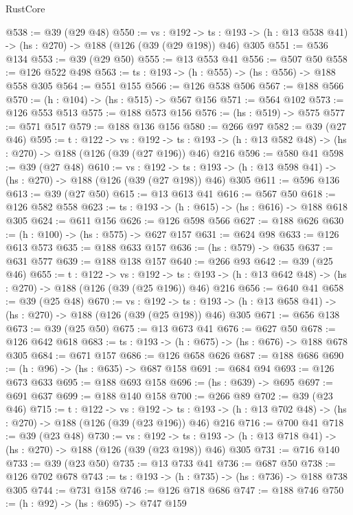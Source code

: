 \begin{lexlean}{RustCore}
\begin{coremodule}
@538 := @39 (@29 @48)
@550 := {vs : @192} ->
  {ts : @193} -> (h : @13 @538 @41) -> (hs : @270) -> @188 (@126 (@39 (@29 @198)) @46) @305
@551 := @536 @134
@553 := @39 (@29 @50)
@555 := @13 @553 @41
@556 := @507 @50
@558 := @126 @522 @498
@563 := {ts : @193} -> (h : @555) -> (hs : @556) -> @188 @558 @305
@564 := @551 @155
@566 := @126 @538 @506
@567 := @188 @566
@570 := (h : @104) -> (hs : @515) -> @567 @156
@571 := @564 @102
@573 := @126 @553 @513
@575 := @188 @573 @156
@576 := (hs : @519) -> @575
@577 := @571 @517
@579 := @188 @136 @156
@580 := @266 @97
@582 := @39 (@27 @46)
@595 := {t : @122} ->
  {vs : @192} ->
  {ts : @193} -> (h : @13 @582 @48) -> (hs : @270) -> @188 (@126 (@39 (@27 @196)) @46) @216
@596 := @580 @41
@598 := @39 (@27 @48)
@610 := {vs : @192} ->
  {ts : @193} -> (h : @13 @598 @41) -> (hs : @270) -> @188 (@126 (@39 (@27 @198)) @46) @305
@611 := @596 @136
@613 := @39 (@27 @50)
@615 := @13 @613 @41
@616 := @567 @50
@618 := @126 @582 @558
@623 := {ts : @193} -> (h : @615) -> (hs : @616) -> @188 @618 @305
@624 := @611 @156
@626 := @126 @598 @566
@627 := @188 @626
@630 := (h : @100) -> (hs : @575) -> @627 @157
@631 := @624 @98
@633 := @126 @613 @573
@635 := @188 @633 @157
@636 := (hs : @579) -> @635
@637 := @631 @577
@639 := @188 @138 @157
@640 := @266 @93
@642 := @39 (@25 @46)
@655 := {t : @122} ->
  {vs : @192} ->
  {ts : @193} -> (h : @13 @642 @48) -> (hs : @270) -> @188 (@126 (@39 (@25 @196)) @46) @216
@656 := @640 @41
@658 := @39 (@25 @48)
@670 := {vs : @192} ->
  {ts : @193} -> (h : @13 @658 @41) -> (hs : @270) -> @188 (@126 (@39 (@25 @198)) @46) @305
@671 := @656 @138
@673 := @39 (@25 @50)
@675 := @13 @673 @41
@676 := @627 @50
@678 := @126 @642 @618
@683 := {ts : @193} -> (h : @675) -> (hs : @676) -> @188 @678 @305
@684 := @671 @157
@686 := @126 @658 @626
@687 := @188 @686
@690 := (h : @96) -> (hs : @635) -> @687 @158
@691 := @684 @94
@693 := @126 @673 @633
@695 := @188 @693 @158
@696 := (hs : @639) -> @695
@697 := @691 @637
@699 := @188 @140 @158
@700 := @266 @89
@702 := @39 (@23 @46)
@715 := {t : @122} ->
  {vs : @192} ->
  {ts : @193} -> (h : @13 @702 @48) -> (hs : @270) -> @188 (@126 (@39 (@23 @196)) @46) @216
@716 := @700 @41
@718 := @39 (@23 @48)
@730 := {vs : @192} ->
  {ts : @193} -> (h : @13 @718 @41) -> (hs : @270) -> @188 (@126 (@39 (@23 @198)) @46) @305
@731 := @716 @140
@733 := @39 (@23 @50)
@735 := @13 @733 @41
@736 := @687 @50
@738 := @126 @702 @678
@743 := {ts : @193} -> (h : @735) -> (hs : @736) -> @188 @738 @305
@744 := @731 @158
@746 := @126 @718 @686
@747 := @188 @746
@750 := (h : @92) -> (hs : @695) -> @747 @159

\end{coremodule}
\end{lexlean}
